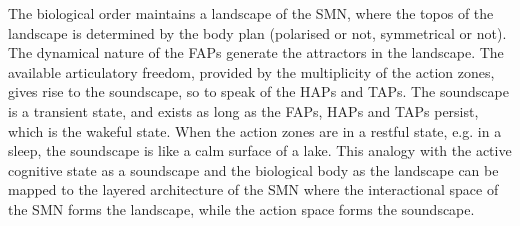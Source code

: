 The biological order maintains a landscape of the SMN, where the topos of the landscape is determined by the body plan (polarised or not, symmetrical or not). The dynamical nature of the FAPs generate the attractors in the landscape. The available articulatory freedom, provided by the multiplicity of the action zones, gives rise to the soundscape, so to speak of the HAPs and TAPs. The soundscape is a transient state, and exists as long as the FAPs, HAPs and TAPs persist, which is the wakeful state. When the action zones are in a restful state, e.g. in a sleep, the soundscape is like a calm surface of a lake. This analogy with the active cognitive state as a soundscape and the biological body as the landscape can be mapped to the layered architecture of the SMN where the interactional space of the SMN forms the landscape, while the action space forms the soundscape.
